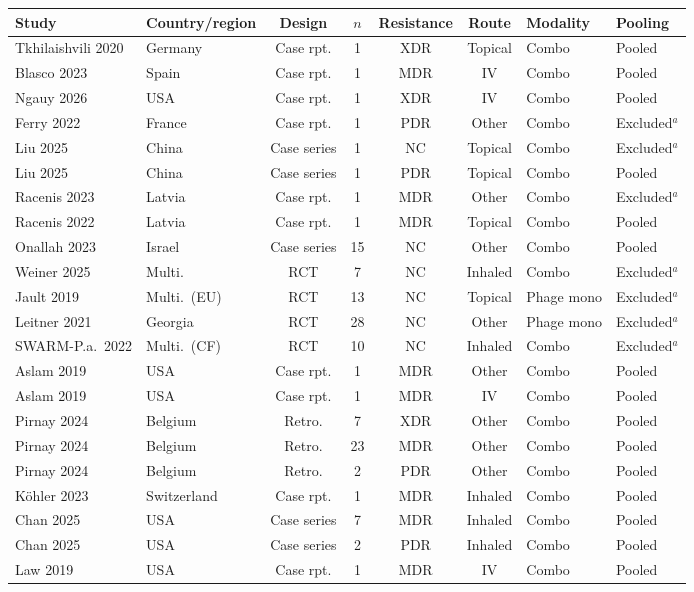 \begin{tabular}{llccccll}
\toprule
Study & Country/region & Design & $n$ & Resistance & Route & Modality & Pooling \\
\midrule
Tkhilaishvili 2020 & Germany & Case rpt. & 1 & XDR & Topical & Combo & Pooled \\
Blasco 2023 & Spain & Case rpt. & 1 & MDR & IV & Combo & Pooled \\
Ngauy 2026 & USA & Case rpt. & 1 & XDR & IV & Combo & Pooled \\
Ferry 2022 & France & Case rpt. & 1 & PDR & Other & Combo & Excluded$^{a}$ \\
Liu 2025 & China & Case series & 1 & NC & Topical & Combo & Excluded$^{a}$ \\
Liu 2025 & China & Case series & 1 & PDR & Topical & Combo & Pooled \\
Racenis 2023 & Latvia & Case rpt. & 1 & MDR & Other & Combo & Excluded$^{a}$ \\
Racenis 2022 & Latvia & Case rpt. & 1 & MDR & Topical & Combo & Pooled \\
Onallah 2023 & Israel & Case series & 15 & NC & Other & Combo & Pooled \\
Weiner 2025 & Multi. & RCT & 7 & NC & Inhaled & Combo & Excluded$^{a}$ \\
Jault 2019 & Multi.\ (EU) & RCT & 13 & NC & Topical & Phage mono & Excluded$^{a}$ \\
Leitner 2021 & Georgia & RCT & 28 & NC & Other & Phage mono & Excluded$^{a}$ \\
SWARM-P.a.\ 2022 & Multi.\ (CF) & RCT & 10 & NC & Inhaled & Combo & Excluded$^{a}$ \\
Aslam 2019 & USA & Case rpt. & 1 & MDR & Other & Combo & Pooled \\
Aslam 2019 & USA & Case rpt. & 1 & MDR & IV & Combo & Pooled \\
Pirnay 2024 & Belgium & Retro. & 7 & XDR & Other & Combo & Pooled \\
Pirnay 2024 & Belgium & Retro. & 23 & MDR & Other & Combo & Pooled \\
Pirnay 2024 & Belgium & Retro. & 2 & PDR & Other & Combo & Pooled \\
K\"ohler 2023 & Switzerland & Case rpt. & 1 & MDR & Inhaled & Combo & Pooled \\
Chan 2025 & USA & Case series & 7 & MDR & Inhaled & Combo & Pooled \\
Chan 2025 & USA & Case series & 2 & PDR & Inhaled & Combo & Pooled \\
Law 2019 & USA & Case rpt. & 1 & MDR & IV & Combo & Pooled \\

\end{tabular}
